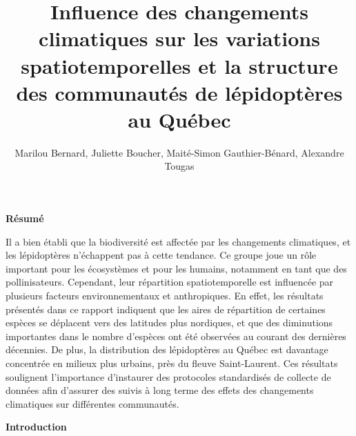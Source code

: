 \documentclass[9pt,twocolumn,twoside,]{pnas-new}
\title{Influence des changements climatiques sur les variations
spatiotemporelles et la structure des communautés de lépidoptères au
Québec}
\author[Université de Sherbrooke, Département de biologie,
BIO500]{Marilou Bernard, Juliette Boucher, Maité-Simon Gauthier-Bénard,
Alexandre Tougas}
\begin{document}
\verticaladjustment{-2pt}



\maketitle
\thispagestyle{firststyle}


\acknow{}

\vspace{-10pt}

\textbf{Résumé}

Il a bien établi que la biodiversité est affectée par les changements
climatiques, et les lépidoptères n'échappent pas à cette tendance. Ce
groupe joue un rôle important pour les écosystèmes et pour les humains,
notamment en tant que des pollinisateurs. Cependant, leur répartition
spatiotemporelle est influencée par plusieurs facteurs environnementaux
et anthropiques. En effet, les résultats présentés dans ce rapport
indiquent que les aires de répartition de certaines espèces se déplacent
vers des latitudes plus nordiques, et que des diminutions importantes
dans le nombre d'espèces ont été observées au courant des dernières
décennies. De plus, la distribution des lépidoptères au Québec est
davantage concentrée en milieux plus urbains, près du fleuve
Saint-Laurent. Ces résultats soulignent l'importance d'instaurer des
protocoles standardisés de collecte de données afin d'assurer des suivis
à long terme des effets des changements climatiques sur différentes
communautés.

\textbf{Introduction}
\end{document}
